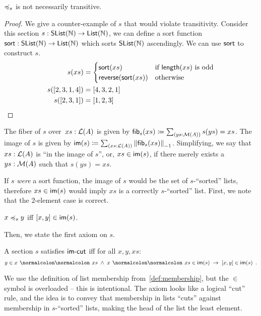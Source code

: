 \begin{toappendix}
    \begin{proposition}
        \label{prop:counterexample-transitivity}
        $\preccurlyeq_{s}$ is not necessarily transitive.
    \end{proposition}
    \begin{proof}
        We give a counter-example of $s$ that would violate transitivity.
        Consider this section $s : \operatorname{\mathsf{SList}}(\mathbb{N}) \to \operatorname{\mathsf{List}}(\mathbb{N})$, we can define a sort function
        $\operatorname{\mathsf{sort}} : \operatorname{\mathsf{SList}}(\mathbb{N}) \to \operatorname{\mathsf{List}}(\mathbb{N})$ which sorts $\operatorname{\mathsf{SList}}(\mathbb{N})$ ascendingly. We can use $\operatorname{\mathsf{sort}}$
        to construct $s$.
        \begin{align*}
            s(xs)        & = \begin{cases}
                                 \operatorname{\mathsf{sort}}(xs)                 & \text{if $\operatorname{\mathsf{length}}(xs)$ is odd} \\
                                 \operatorname{\mathsf{reverse}}(\operatorname{\mathsf{sort}}(xs)) & \text{otherwise}
                             \end{cases} \\
            s([2,3,1,4]) & = [4,3,2,1]                                                                     \\
            s([2,3,1])   & = [1,2,3]
        \end{align*}
    \end{proof}
\end{toappendix}

\begin{definition}[$\blank\in\im{s}$]
    \label{def:in-image}
    The fiber of $s$ over~$xs : \mathcal{L}(A)$ is given by $\fib_{s}(xs) \defeq \dsum{ys : \MM(A)}{s(ys) = xs}$.
    The image of $s$ is given by $\im{s} \defeq \dsum{xs : \LL(A)}{\Trunc[-1]{\fib_{s}(xs)}}$.
    Simplifying, we say that $xs:\mathcal{L}(A)$ is ``in the image of $s$'', or, $xs \in \im{s}$,
    if there merely exists a $ys:\mathcal{M}(A)$ such that $s(ys) = xs$.
\end{definition}

If $s$ \emph{were} a sort function, the image of $s$ would be the set of $s$-``sorted'' lists,
therefore $\inimage{xs}$ would imply $xs$ is a correctly $s$-``sorted'' list.
%
First, we note that the 2-element case is correct.
%
\begin{proposition}
    \label{sort:sort-to-order}
    $x \preccurlyeq_{s} y$ \; iff \; $\inimage{[x, y]}$.
\end{proposition}
%
\noindent Then, we state the first axiom on $s$.
\begin{definition}[$\isheadleast$]
    \label{sort:head-least}
    A section $s$ satisfies $\isheadleast$ iff for all $x, y, xs$:
    \[
        y \in x \cons xs \; \land \; \inimage{x \cons xs} \; \to \; \inimage{[x, y]}
        \enspace.
    \]
\end{definition}
\noindent
We use the definition of list membership from~\cref{def:membership},
but the $\in$ symbol is overloaded -- this is intentional.
The axiom looks like a logical ``cut'' rule,
and the idea is to convey that membership in lists ``cuts'' against membership in $s$-``sorted'' lists,
making the head of the list the least element.

